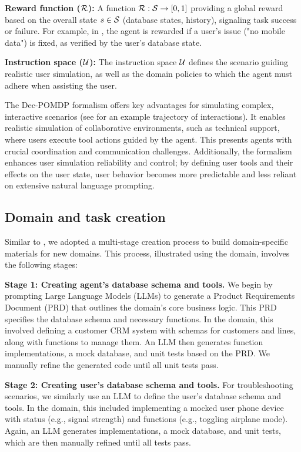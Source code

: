 \textbf{Reward function (${\mathcal{R}}$):} A function ${\mathcal{R}}: {\mathcal{S}} \to [0, 1]$ providing a global reward based on the overall state $s \in {\mathcal{S}}$ (database states, history), signaling task success or failure. For example, in \telecom, the agent is rewarded if a user's issue ("no mobile data") is fixed, as verified by the user's database state.

\textbf{Instruction space (${\mathcal{U}}$):} The instruction space ${\mathcal{U}}$ defines the scenario guiding realistic user simulation, as well as the domain policies to which the agent must adhere when assisting the user.

The Dec-POMDP formalism offers key advantages for simulating complex, interactive scenarios (see  for an example trajectory of interactions). 
It enables realistic simulation of collaborative environments, such as technical support, where users execute tool actions guided by the agent. This presents agents with crucial coordination and communication challenges. 
Additionally, the formalism enhances user simulation reliability and control; by defining user tools and their effects on the user state, user behavior becomes more predictable and less reliant on extensive natural language prompting.



\subsection{Domain and task creation}
\label{sec:curating_domains}



Similar to \taubench, we adopted a multi-stage creation process to build domain-specific materials for new domains. This process, illustrated using the \telecom domain, involves the following stages:

\textbf{Stage 1: Creating agent's database schema and tools.}
We begin by prompting Large Language Models (LLMs) to generate a Product Requirements Document (PRD) that outlines the domain's core business logic. This PRD specifies the database schema and necessary functions. In the \telecom domain, this involved defining a customer CRM system with schemas for customers and lines, along with functions to manage them. An LLM then generates function implementations, a mock database, and unit tests based on the PRD. We manually refine the generated code until all unit tests pass.

\textbf{Stage 2: Creating user's database schema and tools.}
For troubleshooting scenarios, we similarly use an LLM to define the user's database schema and tools. In the \telecom domain, this included implementing a mocked user phone device with status (e.g., signal strength) and functions (e.g., toggling airplane mode). Again, an LLM generates implementations, a mock database, and unit tests, which are then manually refined until all tests pass.

